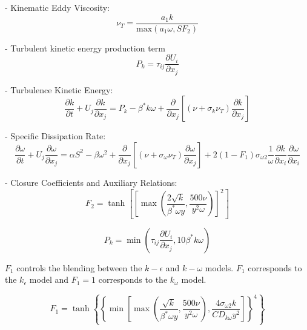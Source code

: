 - Kinematic Eddy Viscosity:
\begin{equation}
    \nu _T  = {\frac{a_1 k}{\mbox{max}(a_1 \omega, S F_2)}}
\end{equation}

- Turbulent kinetic energy production term
\begin{equation}
    P_k = \tau_{ij} \frac{\partial U_i}{\partial x_j}
\end{equation}

- Turbulence Kinetic Energy:
\begin{equation}
    \frac{\partial k}{\partial t} + U_j \frac{\partial k}{\partial x_j} = P_k - \beta^* k\omega + \frac{\partial}{\partial x_j} \left[ \left( \nu + \sigma_k \nu_T \right) \frac{\partial k}{\partial x_j} \right]
\end{equation}


- Specific Dissipation Rate:
\begin{equation}
    \frac{\partial \omega}{\partial t} + U_j \frac{\partial \omega}{\partial x_j} = \alpha S^2 - \beta \omega^2 + \frac{\partial}{\partial x_j} \left[ \left( \nu + \sigma_{\omega} \nu_T \right) \frac{\partial \omega}{\partial x_j} \right] + 2(1 - F_1)\sigma_{\omega 2} \frac{1}{\omega} \frac{\partial k}{\partial x_i} \frac{\partial \omega}{\partial x_i}
\end{equation}


- Closure Coefficients and Auxiliary Relations:
\begin{equation}
    F_2 = \tanh \left[ \left[ \max \left( \frac{2\sqrt{k}}{\beta^* \omega y}, \frac{500 \nu}{y^2 \omega} \right) \right]^2 \right]
\end{equation}

\begin{equation}
    P_k = \min \left( \tau_{ij} \frac{\partial U_i}{\partial x_j}, 10\beta^* k \omega \right)
\end{equation}

$F_1$ controls the blending between the $k-\epsilon$ and $k-\omega$ models. $F_1$ corresponds to the $k_\epsilon$ model and $F_1 = 1$ corresponds to the $k_\omega$ model.

\begin{equation}
    F_1 = \tanh \left\{ \left\{ \min \left[ \max \left( \frac{\sqrt{k}}{\beta^* \omega y}, \frac{500 \nu}{y^2 \omega} \right), \frac{4 \sigma_{\omega 2} k}{CD_{k\omega} y^2} \right] \right\}^4 \right\}
\end{equation}

